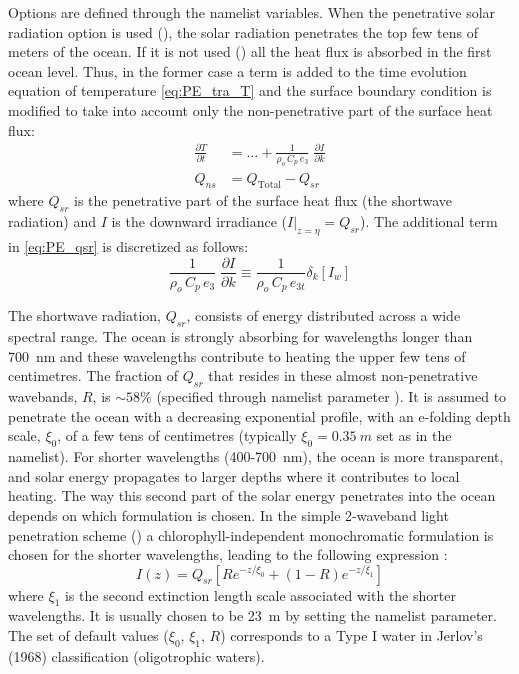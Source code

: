 \documentclass[../main/NEMO_manual]{subfiles}
\begin{document}
Options are defined through the  namelist variables.
When the penetrative solar radiation option is used (),
the solar radiation penetrates the top few tens of meters of the ocean.
If it is not used () all the heat flux is absorbed in the first ocean level.
Thus, in the former case a term is added to the time evolution equation of temperature \autoref{eq:PE_tra_T} and
the surface boundary condition is modified to take into account only the non-penetrative part of the surface 
heat flux:
\begin{equation}
  \label{eq:PE_qsr}
  \begin{split}
    \frac{\partial T}{\partial t} &= {\ldots} + \frac{1}{\rho_o\, C_p \,e_3} \; \frac{\partial I}{\partial k}	\\
    Q_{ns} &= Q_\text{Total} - Q_{sr}
  \end{split}
\end{equation}
where $Q_{sr}$ is the penetrative part of the surface heat flux (\ie the shortwave radiation) and
$I$ is the downward irradiance ($\left. I \right|_{z=\eta}=Q_{sr}$).
The additional term in \autoref{eq:PE_qsr} is discretized as follows:
\begin{equation}
  \label{eq:tra_qsr}
  \frac{1}{\rho_o\, C_p \,e_3} \; \frac{\partial I}{\partial k} \equiv \frac{1}{\rho_o\, C_p\, e_{3t}} \delta_k \left[ I_w \right]
\end{equation}

The shortwave radiation, $Q_{sr}$, consists of energy distributed across a wide spectral range.
The ocean is strongly absorbing for wavelengths longer than 700~nm and these wavelengths contribute to
heating the upper few tens of centimetres.
The fraction of $Q_{sr}$ that resides in these almost non-penetrative wavebands, $R$, is $\sim 58\%$
(specified through namelist parameter ).
It is assumed to penetrate the ocean with a decreasing exponential profile, with an e-folding depth scale, $\xi_0$,
of a few tens of centimetres (typically $\xi_0=0.35~m$ set as  in the  namelist).
For shorter wavelengths (400-700~nm), the ocean is more transparent, and solar energy propagates to
larger depths where it contributes to local heating.
The way this second part of the solar energy penetrates into the ocean depends on which formulation is chosen.
In the simple 2-waveband light penetration scheme ()
a chlorophyll-independent monochromatic formulation is chosen for the shorter wavelengths,
leading to the following expression \citep{Paulson1977}:
\[
  I(z) = Q_{sr} \left[Re^{-z / \xi_0} + \left( 1-R\right) e^{-z / \xi_1} \right]
\]
where $\xi_1$ is the second extinction length scale associated with the shorter wavelengths.
It is usually chosen to be 23~m by setting the  namelist parameter.
The set of default values ($\xi_0$, $\xi_1$, $R$) corresponds to a Type I water in Jerlov's (1968) classification
(oligotrophic waters).
\end{document}
